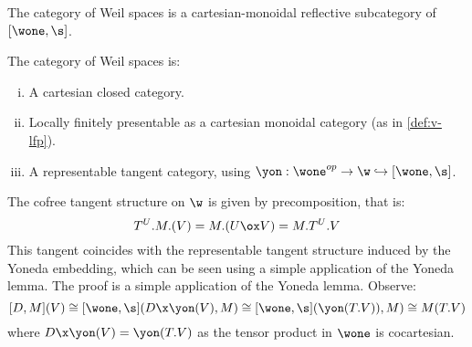 \begin{proposition}
	The category of Weil spaces is a cartesian-monoidal reflective subcategory of $[\wone,\s]$.
\end{proposition}
\begin{corollary}
	The category of Weil spaces is:
	\begin{enumerate}[(i)]
		\item A cartesian closed category.
		\item Locally finitely presentable as a cartesian monoidal category (as in \cref{def:v-lfp}).
		\item A representable tangent category, using $\yon: \wone^{op} \to \w \hookrightarrow [\wone,\s]$.
	\end{enumerate}
\end{corollary}
The cofree tangent structure on $\w$ is given by precomposition, that is:
\[
	T^U.M.(V) = M.(U \ox V) = M.T^U.V
\]
This tangent coincides with the representable tangent structure induced by the Yoneda embedding, which can be seen using a simple application of the Yoneda lemma. The proof is a simple application of the Yoneda lemma. Observe:
\[
    [D,M](V) \cong [\wone,\s](D \x \yon(V), M) \cong [\wone, \s](\yon(T.V)), M) \cong M(T.V)
\]
where $D \x \yon(V) = \yon(T.V)$ as the tensor product in $\wone$ is cocartesian.




